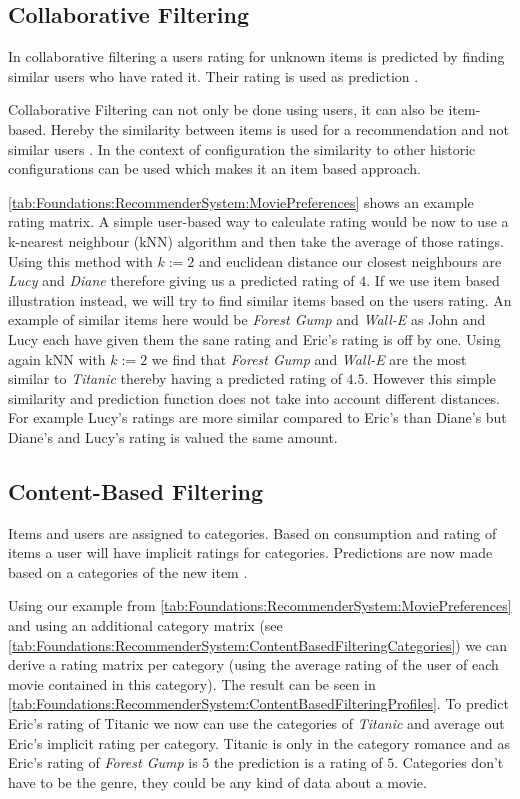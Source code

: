 \subsection{Collaborative Filtering}
In collaborative filtering a users rating for unknown items is predicted by finding similar users who have rated it. Their rating is used as prediction
\cite[~ pp. 7, 8]{felfernigDecisionTasksBasic2018}.

Collaborative Filtering can not only be done using users, it can also be item-based. Hereby the similarity between items is used for a recommendation and not similar users \cite{ricciRecommenderSystemsHandbook2015}. In the context of configuration the similarity to other historic configurations can be used which makes it an item based approach. 

\autoref{tab:Foundations:RecommenderSystem:MoviePreferences} shows an example rating matrix. A simple user-based way to calculate rating would be now to use a k-nearest neighbour (kNN) algorithm and then take the average of those ratings. Using this method with $k := 2$ and euclidean distance our closest neighbours are \textit{Lucy} and \textit{Diane} therefore giving us a predicted rating of $4$.  If we use item based illustration instead, we will try to find similar items based on the users rating. An example of similar items here would be \textit{Forest Gump} and \textit{Wall-E} as John and Lucy each have given them the sane rating and Eric's rating is off by one. Using again kNN with $k := 2$ we find that \textit{Forest Gump} and \textit{Wall-E} are the most similar to \textit{Titanic} thereby having a predicted rating of $4.5$.
However this simple similarity and prediction function does not take into account different distances. For example Lucy's ratings are more similar compared to Eric's than Diane's but Diane's and Lucy's rating is valued the same amount.

\subsection{Content-Based Filtering}
Items and users are assigned to categories. Based on consumption and rating of items a user will have implicit ratings for categories. Predictions are now made based on a categories of the new item \cite[~ pp. 10, 11]{felfernigDecisionTasksBasic2018}.

Using our example from \autoref{tab:Foundations:RecommenderSystem:MoviePreferences} and using an additional category matrix (see \autoref{tab:Foundations:RecommenderSystem:ContentBasedFilteringCategories}) we can derive a rating matrix per category (using the average rating of the user of each movie contained in this category). The result can be seen in \autoref{tab:Foundations:RecommenderSystem:ContentBasedFilteringProfiles}. To predict Eric's rating of Titanic we now can use the categories of \textit{Titanic} and average out Eric's implicit rating per category. Titanic is only in the category romance and as Eric's rating of \textit{Forest Gump} is $5$ the prediction is a rating of $5$. Categories don't have to be the genre, they could be any kind of data about a movie.

